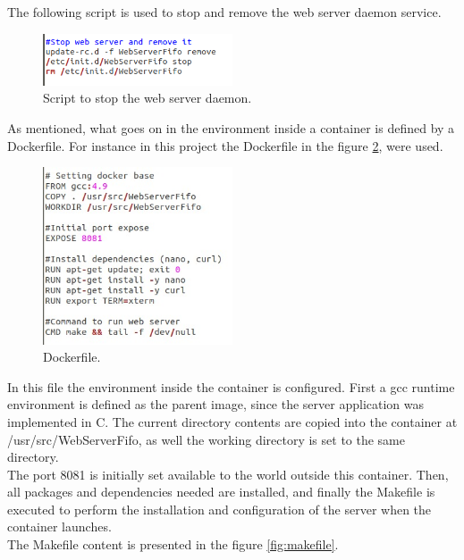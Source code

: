 \documentclass{article}
\begin{document}
The following script is used to stop and remove the web server daemon service. 

\begin{figure}[H]
	\centering
	\captionsetup{justification=centering, margin=1cm}
    \includegraphics[width = 0.5\textwidth]{stopweb.png}
    \caption{Script to stop the web server daemon.}
	\label{fig:stopweb}
\end{figure}

As mentioned, what goes on in the environment inside a container is defined by a Dockerfile. For instance in this project the Dockerfile in the figure \ref{fig:docker}, were used.

\begin{figure}[H]
	\centering
	\captionsetup{justification=centering, margin=1cm}
    \includegraphics[width = 0.5\textwidth]{docker.jpeg}
    \caption{Dockerfile.}
	\label{fig:docker}
\end{figure}

In this file the environment inside the container is configured. First a gcc runtime environment is defined as the parent image, since the server application was implemented in C. The current directory contents are copied into the container at /usr/src/WebServerFifo, as well the working directory is set to the same directory.\\
The port 8081 is initially set available to the world outside this container. Then, all packages and dependencies needed are installed, and finally the Makefile is executed to perform the installation and configuration of the server when the container launches.\\
The Makefile content is presented in the figure \ref{fig:makefile}.
\end{document}
